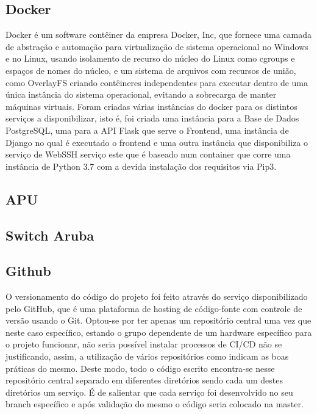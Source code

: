 \subsection{Docker}
Docker é um software contêiner da empresa Docker, Inc, que fornece uma camada de abstração e automação para virtualização de sistema operacional no Windows e no Linux, usando isolamento de recurso do núcleo do Linux como cgroups e espaços de nomes do núcleo, e um sistema de arquivos com recursos de união, como OverlayFS criando contêineres independentes para executar dentro de uma única instância do sistema operacional, evitando a sobrecarga de manter máquinas virtuais.\newline
Foram criadas várias instâncias do docker para os distintos serviços a disponibilizar, isto é, foi criada uma instância para a Base de Dados PostgreSQL, uma para a API Flask que serve o Frontend, uma instância de Django no qual é executado o frontend e uma outra instância que disponibiliza o serviço de WebSSH serviço este que é baseado num container que corre uma instância de Python 3.7 com a devida instalação dos requisitos via Pip3.

\subsection{APU}
\subsection{Switch Aruba}
\subsection{Github}
O versionamento do código do projeto foi feito através do serviço disponibilizado pelo GitHub, que é uma plataforma de hosting de código-fonte com controle de versão usando o Git. \newline
Optou-se por ter apenas um repositório central uma vez que neste caso específico, estando o grupo dependente de um hardware específico para o projeto funcionar, não seria possível instalar processos de CI/CD não se justificando, assim, a utilização de vários repositórios como indicam as boas práticas do mesmo. Deste modo, todo o código escrito encontra-se nesse repositório central separado em diferentes diretórios sendo cada um destes diretórios um serviço. É de salientar que cada serviço foi desenvolvido no seu branch específico e após validação do mesmo o código seria colocado na master.


